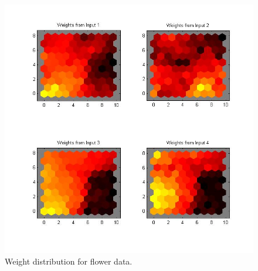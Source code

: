 \documentclass[a4paper]{article}
\begin{document}




  \begin{figure}[H] %
	 \includegraphics[scale=0.7]{q4_q9weightdistribution.jpg}
	 \caption{\label{fig:weightdist} Weight distribution for flower data.}
 \end{figure}
\end{document}
